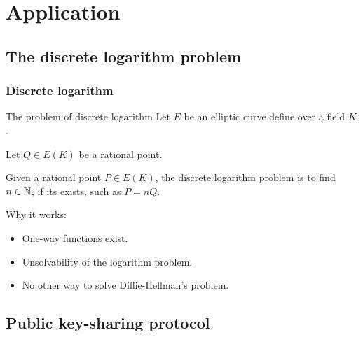 \section{Application}

\subsection{The discrete logarithm problem} 

\begin{frame}[t]
    \frametitle{Discrete logarithm}
    \begin{alertblock}{The problem of discrete logarithm}
        Let $E$ be an elliptic curve define over a field $K$.

        Let $Q \in E(K)$ be a rational point.

        Given a rational point $P \in E(K)$, the discrete logarithm problem is to find $n \in
        \mathbb{N} $, if its exists, such as $P = nQ$.
    \end{alertblock}

    Why it works:
    \begin{itemize}
        \item One-way functions exist.
        \item Unsolvability of the logarithm problem.
        \item No other way to solve Diffie-Hellman's problem.
    \end{itemize}
\end{frame}

\subsection{Public key-sharing protocol}

